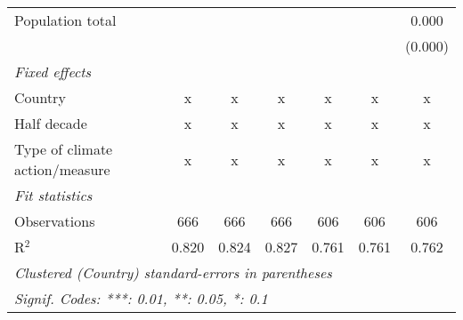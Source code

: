 \begin{tabular}{lcccccc}
   Population total                         &             &               &               &               &               & 0.000\\   
                                            &             &               &               &               &               & (0.000)\\   
   \emph{Fixed effects}\\
   Country                                  & x           & x             & x             & x             & x             & x\\  
   Half decade                              & x           & x             & x             & x             & x             & x\\  
   Type of climate action/measure           & x           & x             & x             & x             & x             & x\\  
   \midrule \emph{Fit statistics}\\
   Observations                             & 666         & 666           & 666           & 606           & 606           & 606\\  
   R$^2$                                    & 0.820       & 0.824         & 0.827         & 0.761         & 0.761         & 0.762\\  
   \midrule
   \multicolumn{7}{l}{\emph{Clustered (Country) standard-errors in parentheses}}\\
   \multicolumn{7}{l}{\emph{Signif. Codes: ***: 0.01, **: 0.05, *: 0.1}}\\
\end{tabular}
\par\endgroup


